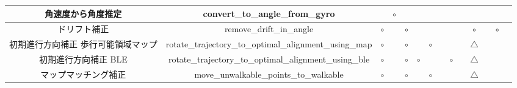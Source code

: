 \begin{table}[ht]
{\begin{tabular}{|c|c|c|c|c|c|c|c|c|c|c|c|c|c|}
			角速度から角度推定          & convert\_to\_angle\_from\_gyro                                      &                              & \multicolumn{1}{c|}{$\circ$} &                              &                              &                              &                                                                                                               &                              &                                  &                                  &    &                              &    \\ \hline
			ドリフト補正             & remove\_drift\_in\_angle                                            & \multicolumn{1}{c|}{$\circ$} &                              & \multicolumn{1}{c|}{$\circ$} &                              &                              &                                                                                                               &                              &                                  & \multicolumn{1}{c|}{$\circ$}     &    & \multicolumn{1}{c|}{$\circ$} &    \\ \hline
			初期進行方向補正 歩行可能領域マップ & rotate\_trajectory\_to\_optimal\_alignment\_using\_map              & \multicolumn{1}{c|}{$\circ$} &                              & \multicolumn{1}{c|}{$\circ$} &                              & \multicolumn{1}{c|}{$\circ$} &                                                                                                               &                              &                                  & \multicolumn{1}{c|}{$\triangle$} &    &                              &    \\ \hline
			初期進行方向補正 BLE       & rotate\_trajectory\_to\_optimal\_alignment\_using\_ble              & \multicolumn{1}{c|}{$\circ$} &                              & \multicolumn{1}{c|}{$\circ$} & \multicolumn{1}{c|}{$\circ$} &                              &                                                                                                               & \multicolumn{1}{c|}{$\circ$} &                                  & \multicolumn{1}{c|}{$\triangle$} &    &                              &    \\ \hline
			マップマッチング補正         & move\_unwalkable\_points\_to\_walkable                              & \multicolumn{1}{c|}{$\circ$} &                              & \multicolumn{1}{c|}{$\circ$} &                              & \multicolumn{1}{c|}{$\circ$} &                                                                                                               &                              &                                  & \multicolumn{1}{c|}{$\triangle$} &    &                              &    \\ \hline

\end{tabular}}
\end{table}
